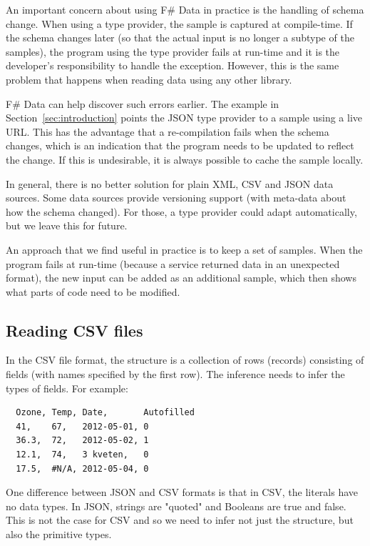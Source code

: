 \documentclass[10pt,preprint,blind,clearpagebib]{sigplanconf}
\newcommand{\kvd}[1]{\textnormal{\textcolor{kvdclr}{\sffamily #1}}}
\newcommand{\str}[1]{\textnormal{\textcolor{strclr}{\sffamily "#1"}}}
\begin{document}
An important concern about using F\# Data in practice is the handling of schema change. When using a
type provider, the sample is captured at compile-time. If the schema changes later (so that the actual
input is no longer a subtype of the samples), the program using the type provider fails at run-time
and it is the developer's responsibility to handle the exception. However, this is the same problem that
happens when reading data using any other library.

F\# Data can help discover such errors earlier. The example in Section~\ref{sec:introduction}
points the JSON type provider to a sample using a live URL. This has the advantage that a re-compilation 
fails when the schema changes, which is an indication that the program needs to be updated to reflect the
change. If this is undesirable, it is always possible to cache the sample locally.

In general, there is no better solution for plain XML, CSV and JSON data sources. Some data sources provide 
versioning support (with meta-data about how the schema changed). For those, a type 
provider could adapt automatically, but we leave this for future.

An approach that we find useful in practice is to keep a set of samples. When the program fails at run-time
(because a service returned data in an unexpected format), the new input can be added as an additional sample,
which then shows what parts of code need to be modified.


\subsection{Reading CSV files}
\label{sec:providers-csv}

In the CSV file format, the structure is a collection of rows (records) consisting of fields 
(with names specified by the first row). The inference needs to infer the types of fields.
For example:
%
{\small{
\begin{verbatim}
  Ozone, Temp, Date,       Autofilled
  41,    67,   2012-05-01, 0
  36.3,  72,   2012-05-02, 1
  12.1,  74,   3 kveten,   0
  17.5,  #N/A, 2012-05-04, 0
\end{verbatim}
}}
%
\noindent
One difference between JSON and CSV formats is that in CSV, the literals have no data types.
In JSON, strings are \str{quoted} and Booleans are \kvd{true} and \kvd{false}. This is not the
case for CSV and so we need to infer not just the structure, but also the primitive types.
\end{document}
